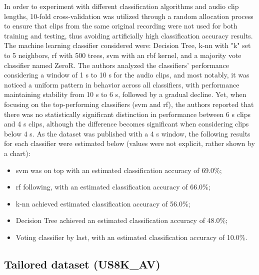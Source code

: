 In order to experiment with different classification algorithms and audio clip lengths, 10-fold cross-validation was utilized through a random allocation process to ensure that clips from the same original recording were not used for both training and testing, thus avoiding artificially high classification accuracy results. The machine learning classifier considered were: Decision Tree, \gls{k-nn} with "k" set to 5 neighbors, \gls{rf} with 500 trees, \gls{svm} with an \gls{rbf} kernel, and a majority vote classifier named ZeroR. The authors analyzed the classifiers' performance considering a window of 1 \gls{s} to 10 \gls{s} for the audio clips, and most notably, it was noticed a uniform pattern in behavior across all classifiers, with performance maintaining stability from 10 \gls{s} to 6 \gls{s}, followed by a gradual decline. Yet, when focusing on the top-performing classifiers (\gls{svm} and \gls{rf}), the authors reported that there was no statistically significant distinction in performance between 6 \gls{s} clips and 4 \gls{s} clips, although the difference becomes significant when considering clips below 4 \gls{s}. As the dataset was published with a 4 \gls{s} window, the following results for each classifier were estimated below (values were not explicit, rather shown by a chart):

\begin{itemize}
    \item \gls{svm} was on top with an estimated classification accuracy of 69.0\%;
    \item \gls{rf} following, with an estimated classification accuracy of 66.0\%;
    \item \gls{k-nn} achieved estimated classification accuracy of 56.0\%;
    \item Decision Tree achieved an estimated classification accuracy of 48.0\%;
    \item Voting classifier by last, with an estimated classification accuracy of 10.0\%. 
\end{itemize}


\subsection{Tailored dataset (US8K\_AV)}
\label{subsec:dataset_US8K_AV}

